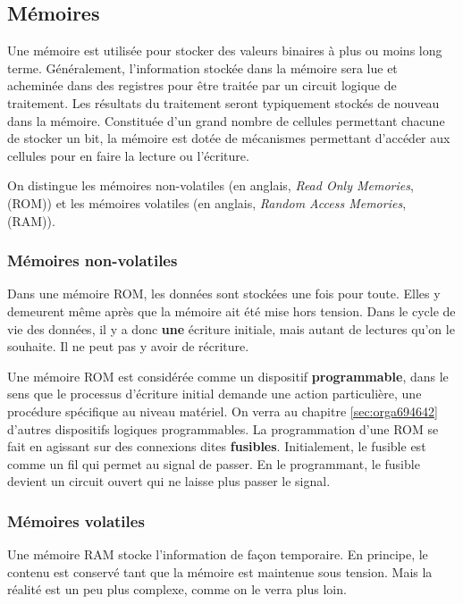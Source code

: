 \documentclass[11pt]{article}
\begin{document}
\subsection{Mémoires}
\label{sec:org58dbeb3}

Une mémoire est utilisée pour stocker des valeurs binaires à plus ou
moins long terme. Généralement, l'information stockée dans la mémoire
sera lue et acheminée dans des registres pour être traitée par un
circuit logique de traitement. Les résultats du traitement seront
typiquement stockés de nouveau dans la mémoire. Constituée d'un grand
nombre de cellules permettant chacune de stocker un bit, la mémoire
est dotée de mécanismes permettant d'accéder aux cellules pour en
faire la lecture ou l'écriture.

On distingue les mémoires non-volatiles (en anglais, \emph{Read Only
Memories}, (ROM)) et les mémoires volatiles (en anglais, \emph{Random Access
Memories}, (RAM)).

\subsubsection{Mémoires non-volatiles}
\label{sec:org76730eb}

Dans une mémoire ROM, les données sont stockées une fois pour
toute. Elles y demeurent même après que la mémoire ait été mise hors
tension. Dans le cycle de vie des données, il y a donc \textbf{une} écriture
initiale, mais autant de lectures qu'on le souhaite. Il ne peut pas y
avoir de récriture.

Une mémoire ROM est considérée comme un dispositif \textbf{programmable},
dans le sens que le processus d'écriture initial demande une action
particulière, une procédure spécifique au niveau matériel. On verra au
chapitre \ref{sec:orga694642} d'autres dispositifs logiques
programmables. La programmation d'une ROM se fait en agissant sur des
connexions dites \textbf{fusibles}. Initialement, le fusible est comme un fil
qui permet au signal de passer. En le programmant, le fusible devient
un circuit ouvert qui ne laisse plus passer le signal.

\subsubsection{Mémoires volatiles}
\label{sec:org7926d28}

Une mémoire RAM stocke l'information de façon temporaire. En principe,
le contenu est conservé tant que la mémoire est maintenue sous
tension. Mais la réalité est un peu plus complexe, comme on le verra
plus loin.
\end{document}
